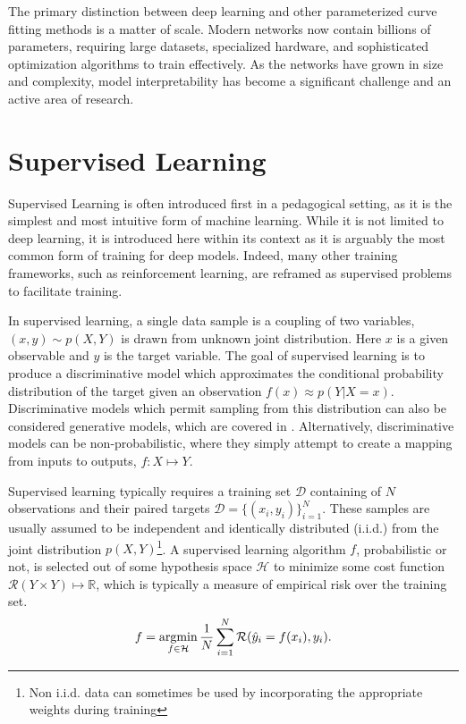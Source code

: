 The primary distinction between deep learning and other parameterized curve fitting methods is a matter of scale.
Modern networks now contain billions of parameters, requiring large datasets, specialized hardware, and sophisticated optimization algorithms to train effectively.
As the networks have grown in size and complexity, model interpretability has become a significant challenge and an active area of research.

\section{Supervised Learning}

Supervised Learning is often introduced first in a pedagogical setting, as it is the simplest and most intuitive form of machine learning. While it is not limited to deep learning, it is introduced here within its context as it is arguably the most common form of training for deep models. Indeed, many other training frameworks, such as reinforcement learning, are reframed as supervised problems to facilitate training.

In supervised learning, a single data sample is a coupling of two variables, $(x, y) \sim p(X, Y)$ is drawn from unknown joint distribution.
Here $x$ is a given observable and $y$ is the target variable.
The goal of supervised learning is to produce a discriminative model which approximates the conditional probability distribution of the target given an observation $f(x) \approx p(Y|X=x)$.
Discriminative models which permit sampling from this distribution can also be considered generative models, which are covered in .
Alternatively, discriminative models can be non-probabilistic, where they simply attempt to create a mapping from inputs to outputs, $f: X \mapsto Y$.

Supervised learning typically requires a training set $\mathcal{D}$ containing of $N$ observations and their paired targets $\mathcal{D} = \{(x_i, y_i)\}_{i=1}^N$.
These samples are usually assumed to be independent and identically distributed (i.i.d.) from the joint distribution $p(X, Y)$\footnote{Non i.i.d. data can sometimes be used by incorporating the appropriate weights during training}.
A supervised learning algorithm $f$, probabilistic or not, is selected out of some hypothesis space $\mathcal{H}$ to minimize some cost function $\mathcal{R}(Y \times Y) \mapsto \mathbb{R}$, which is typically a measure of empirical risk over the training set.
\begin{equation}
    f = \operatorname*{argmin}_{f \in \mathcal{H}} \frac{1}{N} \sum_{i=1}^N \mathcal{R}(\hat{y}_i = f(x_i), y_i).
\end{equation}

